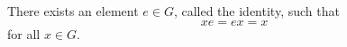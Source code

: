 There exists an element $e \in G$, called the identity, such that
$$xe = ex = x$$
for all $x \in G$.
